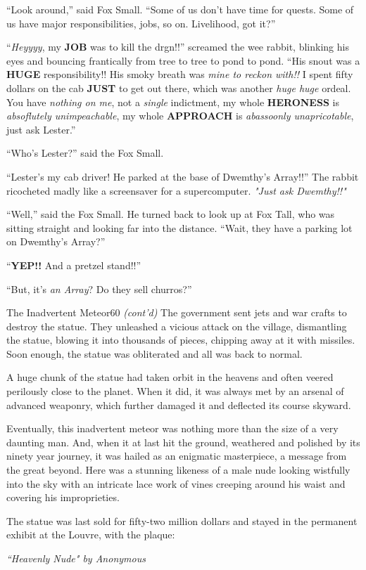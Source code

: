 \documentclass[12pt,twoside]{report}
\begin{document}
``Look around,'' said Fox Small.  ``Some of us don't have time for
        quests.  Some of us have major responsibilities, jobs, so on.
        Livelihood, got it?''

``{\em Heyyyy}, my {\bf JOB} was to kill the drgn!!'' screamed the wee
        rabbit, blinking his eyes and bouncing frantically from tree
        to tree to pond to pond.  ``His snout was a {\bf HUGE}
        responsibility!!  His smoky breath was {\em mine to reckon
          with!!} I spent fifty dollars on the cab {\bf JUST} to get
        out there, which was another {\em huge huge} ordeal.  You have
        {\em nothing on me}, not a {\em single} indictment, my whole
        {\bf HERONESS} is {\em absoflutely unimpeachable}, my whole
        {\bf APPROACH} is {\em abassoonly unapricotable}, just ask
        Lester.''

``Who's Lester?'' said the Fox Small.

``Lester's my cab driver!  He parked at the base of Dwemthy's
        Array!!''  The rabbit ricocheted madly like a screensaver for
        a supercomputer.  {\em "Just ask Dwemthy!!"}

``Well,'' said the Fox Small.  He turned back to look up at Fox Tall,
        who was sitting straight and looking far into the distance.
        ``Wait, they have a parking lot on Dwemthy's Array?''

``{\bf YEP!!}  And a pretzel stand!!''

``But, it's {\em an Array}?  Do they sell churros?''

	\begin{sidebar}{The Inadvertent Meteor}{60}
		\textit{(cont'd)} The government sent jets and war crafts to destroy the statue. They unleashed a vicious attack on the village, dismantling the statue, blowing it into thousands of pieces, chipping away at it with missiles. Soon enough, the statue was obliterated and all was back to normal.\vspace{6pt}
		
		A huge chunk of the statue had taken orbit in the heavens and often veered perilously close to the planet. When it did, it was always met by an arsenal of advanced weaponry, which further damaged it and deflected its course skyward.\vspace{6pt}

		Eventually, this inadvertent meteor was nothing more than the size of a very daunting man. And, when it at last hit the ground, weathered and polished by its ninety year journey, it was hailed as an enigmatic masterpiece, a message from the great beyond. Here was a stunning likeness of a male nude looking wistfully into the sky with an intricate lace work of vines creeping around his waist and covering his improprieties.\vspace{6pt}

		The statue was last sold for fifty-two million dollars and stayed in the permanent exhibit at the Louvre, with the plaque:\vspace{6pt}
		
		\indent \textit{``Heavenly Nude" by Anonymous}
	\end{sidebar}
\end{document}
